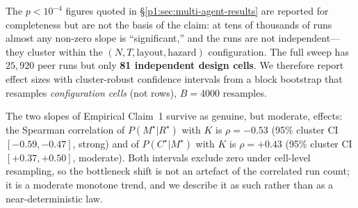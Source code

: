\documentclass{article}
\begin{document}
The $p<10^{-4}$ figures quoted in \S\ref{p1:sec:multi-agent-results} are reported for completeness but are not the basis of the claim: at tens of thousands of runs almost any non-zero slope is ``significant,'' and the runs are not independent---they cluster within the $(N,T,\text{layout},\text{hazard})$ configuration. The full sweep has $25{,}920$ peer runs but only \textbf{81 independent design cells}. We therefore report effect sizes with cluster-robust confidence intervals from a block bootstrap that resamples \emph{configuration cells} (not rows), $B{=}4000$ resamples.

The two slopes of Empirical Claim~1 survive as genuine, but moderate, effects: the Spearman correlation of $P(M^\star|R^\star)$ with $K$ is $\rho=-0.53$ (95\% cluster CI $[-0.59,-0.47]$, strong) and of $P(C^\star|M^\star)$ with $K$ is $\rho=+0.43$ (95\% cluster CI $[+0.37,+0.50]$, moderate). Both intervals exclude zero under cell-level resampling, so the bottleneck shift is not an artefact of the correlated run count; it is a moderate monotone trend, and we describe it as such rather than as a near-deterministic law.
\end{document}
